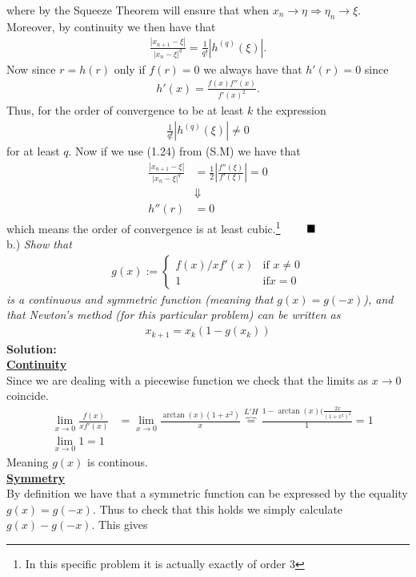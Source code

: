 \documentclass[12pt,
               a4paper,
               article,
               oneside,
               norsk,oldfontcommands]{memoir}
\newcommand{\Q}{ \qquad \hfill \blacksquare}
\newcommand{\spaze}{\vspace{4mm}\\}
\begin{document}
where by the Squeeze Theorem will ensure that when $x_n \rightarrow \eta \Rightarrow \eta_{n} \rightarrow \xi$. Moreover, by continuity we then have that 
\begin{align*}
\frac{|x_{n+1} - \xi|}{|x_n - \xi|^q} = \frac{1}{q!} |h^{(q)}(\xi)|.
\end{align*}
Now since $r = h(r)$ only if $f(r) = 0$ we always have that $h'(r) = 0$ since 
\begin{align*}
h'(x) = \frac{f(x) f''(x)}{f'(x)^2}.
\end{align*}
Thus, for the order of convergence to be at least $k$ the expression 
\begin{align*}
\frac{1}{q!} |h^{(q)} (\xi)| \neq 0
\end{align*}
for at least $q$. Now if we use (1.24) from (S.M) we have that 
\begin{align*}
\frac{|x_{n+1} - \xi|}{|x_n - \xi|^q} &= \frac{1}{2} \left| \frac{f''(\xi)}{f'(\xi)} \right| = 0 \\[5pt]
&\Downarrow \\[5pt]
h''(r) &= 0
\end{align*}
which means the order of convergence is at least cubic.\footnote{In this specific problem it is actually exactly of order 3} $\Q$ \spaze 
b.) \emph{Show that}
\begin{align*}
g(x) :=
    \begin{cases}
        f(x) / x f'(x) & \text{if } x \neq 0 \\
        1 & \text{if} x = 0
    \end{cases}
\end{align*}
\emph{is a continuous and symmetric function (meaning that $g(x) = g(-x)$), and that Newton's method (for this particular problem) can be written as} 
\begin{align*}
x_{k+1} = x_k(1 - g(x_k))
\end{align*}
\textbf{Solution:} \spaze 
\underline{\textbf{Continuity}}\spaze 
Since we are dealing with a piecewise function we check that the limits as $x \rightarrow 0$ coincide. 
\begin{align}
&\lim_{x \to 0} \frac{f(x)}{x f'(x)} &= \lim_{x \to 0} \frac{\arctan(x)(1 + x^2)}{x} \overbrace{=}^{L'H} \frac{1 - \arctan(x)(\frac{2x}{(1+x^2)^2}}{1} = 1 \\[5pt]
&\lim_{x \to 0} 1 = 1
\end{align}
Meaning $g(x)$ is continous. \spaze 
\underline{\textbf{Symmetry}}\spaze 
By definition we have that a symmetric function can be expressed by the equality $g(x) = g(-x)$. Thus to check that this holds we simply calculate $g(x) - g(-x)$. This gives 
\end{document}
